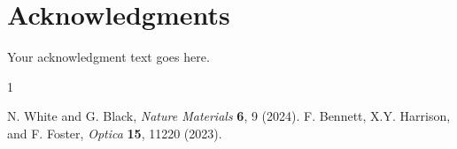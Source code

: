 \documentclass[11pt]{article}
\begin{document}
\section*{\fontsize{11}{14}\selectfont Acknowledgments}
\vspace{-0.25cm}
\begin{flushleft}
\fontsize{11}{14}\selectfont %
Your acknowledgment text goes here.
\end{flushleft}


\begin{thebibliography}{1}
\small
\vspace{-0.25cm}

 N. White  and G. Black, {\em Nature Materials} {{\bf 6}, 9 (2024).} 
\vspace{-0.25cm} %
 F. Bennett,  X.Y. Harrison, and  F. Foster, {\em Optica} {{\bf 15}, 11220 (2023).}

\end{thebibliography}
\end{document}
